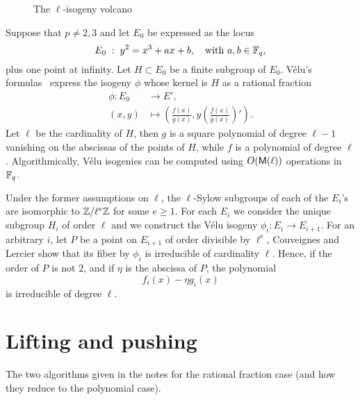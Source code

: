 \documentclass{sig-alternate}
\begin{document}
\begin{figure}
  \centering
  \begin{tikzpicture}
  \end{tikzpicture}
  \caption{The $\ell$-isogeny volcano}
  \label{fig:volcano}
\end{figure}

Suppose that $p\ne2,3$ and let $E_0$ be expressed as the locus
\begin{equation}
  E_0 \;:\; y^2 = x^3 + ax + b,
  \quad\text{with $a,b\in\F_q$},
\end{equation}
plus one point at infinity.  Let $H\subset E_0$ be a finite subgroup of
$E_0$.  Vélu's formulas~\cite{velu71} express the isogeny $\phi$ whose
kernel is $H$ as a rational fraction
\begin{equation}
  \begin{aligned}
    \phi: E_0 &\to E',\\
    (x,y) &\mapsto \left(\frac{f(x)}{g(x)}, y\left(\frac{f(x)}{g(x)}\right)'\right).
  \end{aligned}
\end{equation}
Let $\ell$ be the cardinality of $H$, then $g$ is a square polynomial
of degree $\ell-1$ vanishing on the abscissas of the points of $H$,
while $f$ is a polynomial of degree $\ell$. Algorithmically, Vélu
isogenies can be computed using $O(\Mult(\ell))$ operations in $\F_q$.

Under the former assumptions on $\ell$, the $\ell$-Sylow subgroups of
each of the $E_i$'s are isomorphic to $\Z/\ell^e\Z$ for some
$e\ge1$. For each $E_i$ we consider the unique subgroup $H_i$ of order
$\ell$ and we construct the Vélu isogeny $\phi_i:E_i\to E_{i+1}$. For
an arbitrary $i$, let $P$ be a point on $E_{i+1}$ of order divisible
by $\ell^e$, Couveignes and Lercier show that its fiber by $\phi_i$ is
irreducible of cardinality $\ell$. Hence, if the order of $P$ is not
$2$, and if $\eta$ is the abscissa of $P$, the polynomial
\begin{equation}
  \label{eq:isog-fiber}
  f_i(x) - \eta g_i(x)
\end{equation}
is irreducible of degree $\ell$.


\section{Lifting and pushing}
\label{sec:lift-push}

The two algorithms given in the notes for the rational fraction case
(and how they reduce to the polynomial case).
\end{document}
